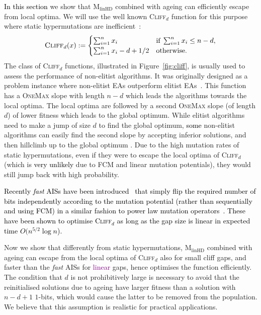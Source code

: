 \documentclass[lettersize,journal]{IEEEtran}
\newcommand{\new}[1]{\textcolor{black}{#1}}
\newcommand{\rev}[1]{\textcolor{black}{#1}}
\newcommand{\rerev}[1]{\textcolor{purple}{#1}}
\newcommand{\cliff}{\textsc{Cliff}$_d$}
\newcommand{\linHD}{M$_{\text{linHD}}$}
\begin{document}
\new{ In this section} we show that {\linHD } combined with ageing can efficiently escape from local optima. We will use the well known \cliff{} function for this purpose where static hypermutations are inefficient~\cite{CorusOlivetoYazdani2019TCS}:
\begin{equation} \label{func:cliff}
	\textsc{Cliff}_{d}(x):=\begin{cases}
		\sum_{i=1}^n x_i & \text{if}\; \sum_{i=1}^n x_i \leq n-d, \\
		\sum_{i=1}^n x_i -d+ 1/2 & \text{otherwise.}
	\end{cases}
\end{equation}
The class of \cliff{} functions, illustrated in Figure~\ref{fig:cliff}, is usually used to assess the performance of non-elitist algorithms. It was originally designed as a problem instance where non-elitist EAs outperform elitist EAs~\cite{JaegerskuepperStorch}. This function  has a \textsc{OneMax} slope with length $n-d$ which leads the algorithms towards the local optima. The local optima are followed by a second \textsc{OneMax} slope (of length $d$) of lower fitness which leads to the global optimum. While elitist algorithms need to make a jump of size $d$ to find the global optimum, \rev{some} non-elitist algorithms can easily find the second slope by accepting inferior solutions, and then hillclimb up to the global optimum \cite{LissovoiOlivetoWarwicker2019AAAI,CorusOlivetoYazdani2019TCS,CorusOlivetoYazdani2021TEVC,HeviaSudholtAlgo24,DoerrIJCAI-25}. 
Due to the high mutation rates of static hypermutations, even if they were to escape the local optima of \cliff{} (which is \new{very unlikely} due to FCM and linear mutation potentials), they would still jump back with high probability.  

\textcolor{black}{Recently {\it fast} AISs have been introduced~\cite{CorusOlivetoYazdani2021TEVC} that simply flip the required number of bits independently according to the mutation potential (rather than sequentially and using FCM) in a similar fashion to power law mutation operators~\cite{DoerrGECCO2017FastGA}. These have been shown to optimise \cliff{} as long as the gap size is linear in expected time $O(n^{5/2} \log n$).
}

Now we show that differently from static hypermutations, {\linHD }
combined with ageing can escape from the local optima of \cliff{} also for small cliff gaps, and faster than the {\it fast} AISs for \rerev{linear} gaps, 
hence optimises the function efficiently. The condition that $d$ is not prohibitively large is necessary to avoid
that the reinitialised solutions due to ageing have larger fitness than a solution with $n-d+1$ $1$-bits, {\color{black} which would cause the latter to be removed from the population}.
We believe that this assumption is realistic for practical applications. 
\end{document}

